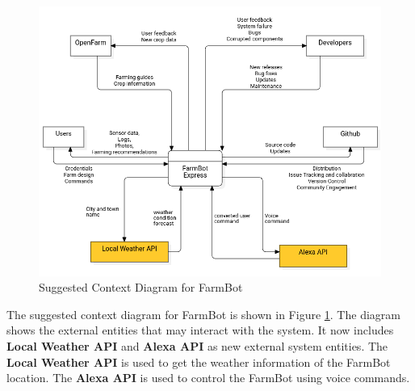 \begin{figure}[H]
    \centering
    \includegraphics[width=1\textwidth]{Figures/SuggestedContextDiagram.png}
    \caption{Suggested Context Diagram for FarmBot}\label{fig:suggested_context}
\end{figure}

The suggested context diagram for FarmBot is shown in Figure \ref{fig:suggested_context}. The diagram shows the external entities that may interact with the system. It now includes \cite{weather_api} \textbf{Local Weather API} and \cite{alexa_api} \textbf{Alexa API} as new external system entities. The \textbf{Local Weather API} is used to get the weather information of the FarmBot location. The \textbf{Alexa API} is used to control the FarmBot using voice commands.

